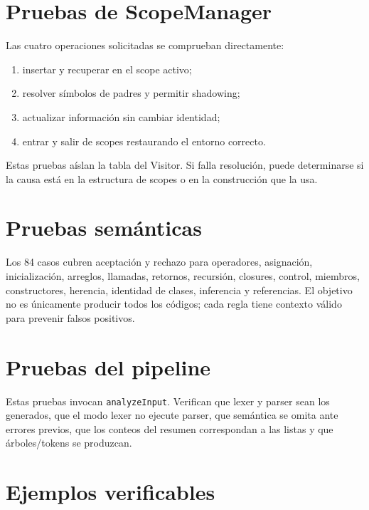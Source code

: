 \documentclass[11pt,letterpaper,oneside]{report}
\newcommand{\codigo}[1]{\texttt{#1}}
\begin{document}
\section{Pruebas de ScopeManager}

Las cuatro operaciones solicitadas se comprueban directamente:

\begin{enumerate}
  \item insertar y recuperar en el scope activo;
  \item resolver símbolos de padres y permitir shadowing;
  \item actualizar información sin cambiar identidad;
  \item entrar y salir de scopes restaurando el entorno correcto.
\end{enumerate}

Estas pruebas aíslan la tabla del Visitor. Si falla resolución, puede determinarse si
la causa está en la estructura de scopes o en la construcción que la usa.

\section{Pruebas semánticas}

Los 84 casos cubren aceptación y rechazo para operadores, asignación, inicialización,
arreglos, llamadas, retornos, recursión, closures, control, miembros, constructores,
herencia, identidad de clases, inferencia y referencias. El objetivo no es únicamente
producir todos los códigos; cada regla tiene contexto válido para prevenir falsos
positivos.

\section{Pruebas del pipeline}

Estas pruebas invocan \codigo{analyzeInput}. Verifican que lexer y parser sean los
generados, que el modo lexer no ejecute parser, que semántica se omita ante errores
previos, que los conteos del resumen correspondan a las listas y que árboles/tokens
se produzcan.

\section{Ejemplos verificables}
\end{document}
